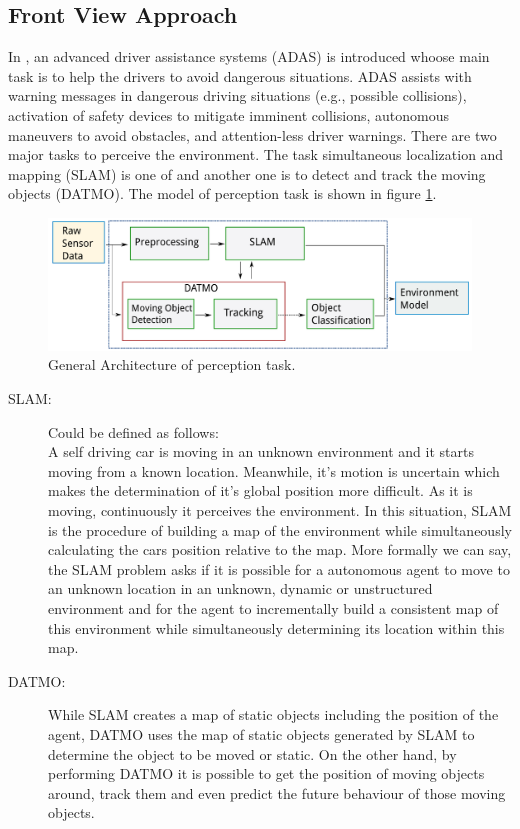\subsection{Front View Approach}
In \cite{Chavez_Garcia_2016}, an advanced driver assistance systems (ADAS) is introduced whoose main task is to help the drivers to avoid dangerous situations. ADAS assists with warning messages in dangerous driving situations (e.g., possible collisions), activation of safety devices to mitigate imminent collisions, autonomous maneuvers to avoid obstacles, and attention-less driver warnings\cite{Chavez_Garcia_2016}. There are two major tasks to perceive the environment. The task simultaneous localization and mapping (SLAM) is one of and another one is to detect and track the moving objects (DATMO). The model of perception task is shown in figure \ref{fig:datmoslam}.
\begin{figure}
  \centering
  \includegraphics[width=.6\textwidth]{src/pic/datmo_slam_arch.png}
  \caption{General Architecture of perception task. \cite{Chavez_Garcia_2016}}
  \label{fig:datmoslam}
\end{figure}
\begin{description}
    \item[SLAM:] Could be defined as follows:\\
    A self driving car is moving in an unknown environment and it starts moving from a known location. Meanwhile, it's motion is uncertain which makes the determination of it's global position more difficult. As it is moving, continuously it perceives the environment. In this situation, SLAM is the procedure of building a map of the environment while simultaneously calculating the cars position relative to the map\cite{Thrun2008}. More formally we can say, the SLAM problem asks if it is possible for a autonomous agent to move to an unknown location in an unknown, dynamic or unstructured environment and for the agent to incrementally build a consistent map of this environment while simultaneously determining its location within this map\cite{Bailey:1638022}.
    \item[DATMO:] While SLAM creates a map of static objects including the position of the agent, DATMO uses the map  of static objects generated by SLAM \cite{Azim:6232303} to determine the object to be moved or static\cite{vu2008mapping}. On the other hand, by performing DATMO it is possible to get the position of moving objects around, track them and even predict the future behaviour of those moving objects\cite{vu2008mapping}.
\end{description}

